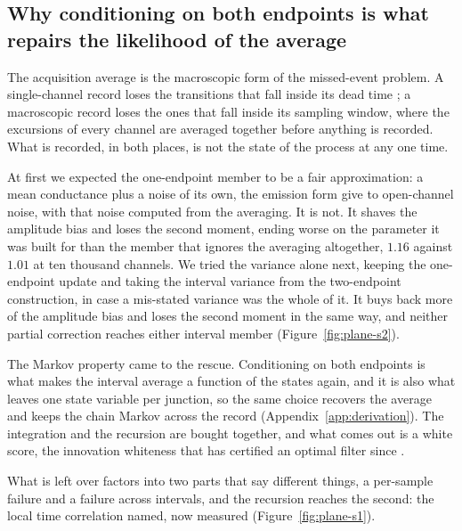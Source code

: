 
\subsection*{Why conditioning on both endpoints is what repairs the likelihood of the average}
The acquisition average is the macroscopic form of the missed-event problem. A single-channel record loses the transitions that fall inside its dead time \citep{colquhoun1995fitting}; a macroscopic record loses the ones that fall inside its sampling window, where the excursions of every channel are averaged together before anything is recorded. What is recorded, in both places, is not the state of the process at any one time.

At first we expected the one-endpoint member to be a fair approximation: a mean conductance plus a noise of its own, the emission form \citet{munch2022bayesian} give to open-channel noise, with that noise computed from the averaging. It is not. It shaves the amplitude bias and loses the second moment, ending worse on the parameter it was built for than the member that ignores the averaging altogether, $1.16$ against $1.01$ at ten thousand channels. We tried the variance alone next, keeping the one-endpoint update and taking the interval variance from the two-endpoint construction, in case a mis-stated variance was the whole of it. It buys back more of the amplitude bias and loses the second moment in the same way, and neither partial correction reaches either interval member (Figure~\ref{fig:plane-s2}).

The Markov property came to the rescue. Conditioning on both endpoints is what makes the interval average a function of the states again, and it is also what leaves one state variable per junction, so the same choice recovers the average and keeps the chain Markov across the record (Appendix~\ref{app:derivation}). The integration and the recursion are bought together, and what comes out is a white score, the innovation whiteness that has certified an optimal filter since \citet{mehra1970identification}.

What is left over factors into two parts that say different things, a per-sample failure and a failure across intervals, and the recursion reaches the second: the local time correlation \citet{milescu2005maximum} named, now measured (Figure~\ref{fig:plane-s1}).

